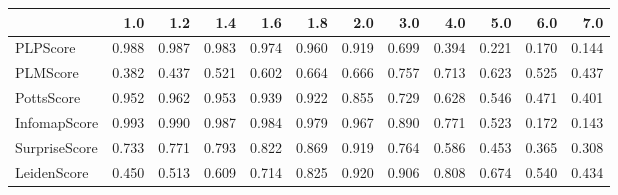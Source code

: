 \begin{tabular}{lrrrrrrrrrrr}
\toprule
{} &   1.0 &   1.2 &   1.4 &   1.6 &   1.8 &   2.0 &   3.0 &   4.0 &   5.0 &   6.0 &   7.0 \\
\midrule
PLPScore      & 0.988 & 0.987 & 0.983 & 0.974 & 0.960 & 0.919 & 0.699 & 0.394 & 0.221 & 0.170 & 0.144 \\
PLMScore      & 0.382 & 0.437 & 0.521 & 0.602 & 0.664 & 0.666 & 0.757 & 0.713 & 0.623 & 0.525 & 0.437 \\
PottsScore    & 0.952 & 0.962 & 0.953 & 0.939 & 0.922 & 0.855 & 0.729 & 0.628 & 0.546 & 0.471 & 0.401 \\
InfomapScore  & 0.993 & 0.990 & 0.987 & 0.984 & 0.979 & 0.967 & 0.890 & 0.771 & 0.523 & 0.172 & 0.143 \\
SurpriseScore & 0.733 & 0.771 & 0.793 & 0.822 & 0.869 & 0.919 & 0.764 & 0.586 & 0.453 & 0.365 & 0.308 \\
LeidenScore   & 0.450 & 0.513 & 0.609 & 0.714 & 0.825 & 0.920 & 0.906 & 0.808 & 0.674 & 0.540 & 0.434 \\
\bottomrule
\end{tabular}
